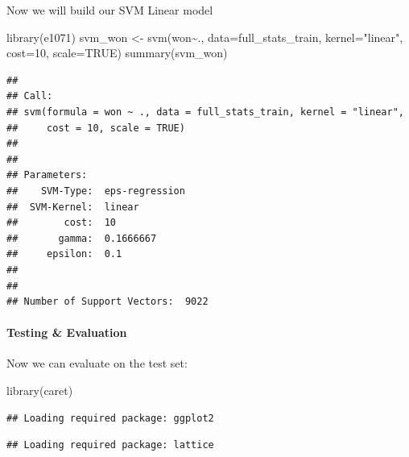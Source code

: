 \documentclass[
]{article}
\newenvironment{Shaded}{\begin{snugshade}}{\end{snugshade}}
\newcommand{\AttributeTok}[1]{\textcolor[rgb]{0.77,0.63,0.00}{#1}}
\newcommand{\ConstantTok}[1]{\textcolor[rgb]{0.00,0.00,0.00}{#1}}
\newcommand{\DecValTok}[1]{\textcolor[rgb]{0.00,0.00,0.81}{#1}}
\newcommand{\FloatTok}[1]{\textcolor[rgb]{0.00,0.00,0.81}{#1}}
\newcommand{\FunctionTok}[1]{\textcolor[rgb]{0.00,0.00,0.00}{#1}}
\newcommand{\NormalTok}[1]{#1}
\newcommand{\OtherTok}[1]{\textcolor[rgb]{0.56,0.35,0.01}{#1}}
\newcommand{\SpecialCharTok}[1]{\textcolor[rgb]{0.00,0.00,0.00}{#1}}
\newcommand{\StringTok}[1]{\textcolor[rgb]{0.31,0.60,0.02}{#1}}
\begin{document}
Now we will build our SVM Linear model

\begin{Shaded}
\begin{Highlighting}[]
\FunctionTok{library}\NormalTok{(e1071)}
\NormalTok{svm\_won }\OtherTok{\textless{}{-}} \FunctionTok{svm}\NormalTok{(won}\SpecialCharTok{\textasciitilde{}}\NormalTok{., }\AttributeTok{data=}\NormalTok{full\_stats\_train, }\AttributeTok{kernel=}\StringTok{"linear"}\NormalTok{, }\AttributeTok{cost=}\DecValTok{10}\NormalTok{, }\AttributeTok{scale=}\ConstantTok{TRUE}\NormalTok{)}
\FunctionTok{summary}\NormalTok{(svm\_won)}
\end{Highlighting}
\end{Shaded}

\begin{verbatim}
## 
## Call:
## svm(formula = won ~ ., data = full_stats_train, kernel = "linear", 
##     cost = 10, scale = TRUE)
## 
## 
## Parameters:
##    SVM-Type:  eps-regression 
##  SVM-Kernel:  linear 
##        cost:  10 
##       gamma:  0.1666667 
##     epsilon:  0.1 
## 
## 
## Number of Support Vectors:  9022
\end{verbatim}

\hypertarget{testing-evaluation}{%
\paragraph{Testing \& Evaluation}\label{testing-evaluation}}

Now we can evaluate on the test set:

\begin{Shaded}
\begin{Highlighting}[]
\FunctionTok{library}\NormalTok{(caret)}
\end{Highlighting}
\end{Shaded}

\begin{verbatim}
## Loading required package: ggplot2
\end{verbatim}

\begin{verbatim}
## Loading required package: lattice
\end{verbatim}

\begin{Shaded}
\end{Shaded}
\end{document}
